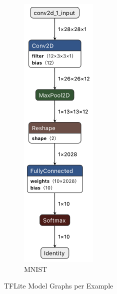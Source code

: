 \documentclass{tum-presentation}
\begin{document}
\begin{frame}
\begin{figure}[h]
\begin{subfigure}[b]{0.3\textwidth}
         \includegraphics[width=0.4\textwidth]{figures/mnist_graph.png}
         \caption{MNIST}
         \label{fig:netron_mnist}
     \end{subfigure}
        \caption{TFLite Model Graphs per Example}
        \label{fig:netron}
\end{figure}

\end{frame}
\end{document}
